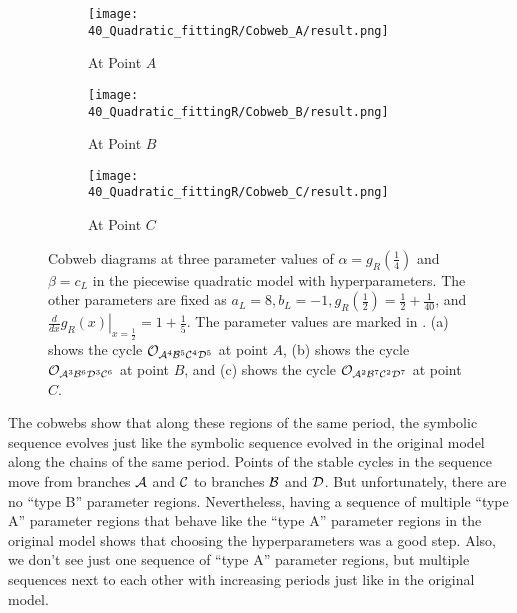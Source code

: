 \begin{figure}
	\centering
	\begin{subfigure}{0.3\textwidth}
		\centering
		\texttt{[image: 40\_Quadratic\_fittingR/Cobweb\_A/result.png]}
		\caption{At Point $A$}
		\label{fig:setup.quad.hyper.1.cobweb.A}
	\end{subfigure}
	\begin{subfigure}{0.3\textwidth}
		\centering
		\texttt{[image: 40\_Quadratic\_fittingR/Cobweb\_B/result.png]}
		\caption{At Point $B$}
		\label{fig:setup.quad.hyper.1.cobweb.B}
	\end{subfigure}
	\begin{subfigure}{0.3\textwidth}
		\centering
		\texttt{[image: 40\_Quadratic\_fittingR/Cobweb\_C/result.png]}
		\caption{At Point $C$}
		\label{fig:setup.quad.hyper.1.cobweb.C}
	\end{subfigure}
	\caption[Cobwebs of the first piecewise quadratic model with hyperparameters]{
	Cobweb diagrams at three parameter values of $\alpha = g_R\left(\frac{1}{4}\right)$ and $\beta = c_L$ in the piecewise quadratic model with hyperparameters.
	The other parameters are fixed as $a_L = 8, b_L = -1, g_R\left(\frac{1}{2}\right) = \frac{1}{2} + \frac{1}{40}$, and $\left. \frac{d}{dx} g_R(x) \right|_{x = \frac{1}{2}} = 1 + \frac{1}{5}$.
	The parameter values are marked in .
	(a) shows the cycle $\mathcal{O}_{\mathcal{A}^4\mathcal{B}^5\mathcal{C}^4\mathcal{D}^5}$ at point $A$, (b) shows the cycle $\mathcal{O}_{\mathcal{A}^3\mathcal{B}^6\mathcal{D}^3\mathcal{C}^6}$ at point $B$, and (c) shows the cycle $\mathcal{O}_{\mathcal{A}^2\mathcal{B}^7\mathcal{C}^2\mathcal{D}^7}$ at point $C$.
	}
	\label{fig:setup.quad.hyper.1.cobwebs}
\end{figure}


The cobwebs show that along these regions of the same period, the symbolic sequence evolves just like the symbolic sequence evolved in the original model along the chains of the same period.
Points of the stable cycles in the sequence move from branches $\mathcal{A}$ and $\mathcal{C}$ to branches $\mathcal{B}$ and $\mathcal{D}$.
But unfortunately, there are no ``type B'' parameter regions.
Nevertheless, having a sequence of multiple ``type A'' parameter regions that behave like the ``type A'' parameter regions in the original model shows that choosing the hyperparameters was a good step.
Also, we don't see just one sequence of ``type A'' parameter regions, but multiple sequences next to each other with increasing periods just like in the original model.
